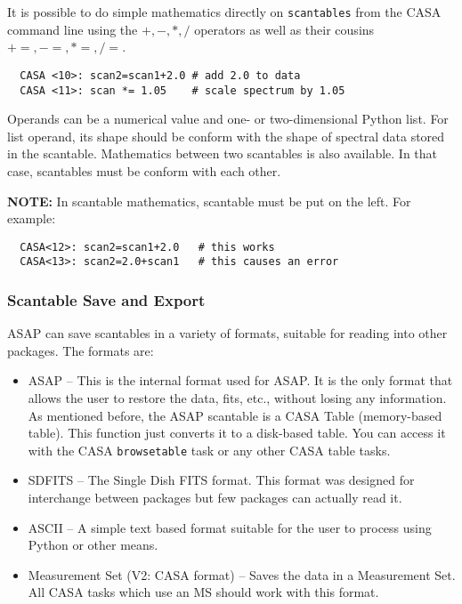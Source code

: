 It is possible to do simple mathematics directly on {\tt scantables}
from the CASA command line using the $+,-,*,/$ operators as well as
their cousins $+=, -=, *=, /=$.  

\small
\begin{verbatim}
  CASA <10>: scan2=scan1+2.0 # add 2.0 to data 
  CASA <11>: scan *= 1.05    # scale spectrum by 1.05 
\end{verbatim}
\normalsize

Operands can be
a numerical value and one- or two-dimensional Python list. For list
operand, its shape should be conform with the shape of spectral data stored in the scantable.
Mathematics between two scantables is also available. In that case,
scantables must be conform with each other.

{\bf NOTE:} In scantable mathematics, scantable must be put on the left.
For example:
\begin{verbatim}
  CASA<12>: scan2=scan1+2.0   # this works
  CASA<13>: scan2=2.0+scan1   # this causes an error
\end{verbatim}


\subsubsection{Scantable Save and Export}
\label{subsubsection:sd.asap.scantable.export}

ASAP can save scantables in a variety of formats, suitable for reading
into other packages. The formats are: 

\begin{itemize}
    \item ASAP -- This is the internal format used for ASAP. It is the only
     format that allows the user to restore the data, fits, etc.,
     without losing any information. As mentioned before, the ASAP
     scantable is a CASA Table (memory-based table). This function
     just converts it to a disk-based table. You can access it with
     the CASA {\tt browsetable} task or any other CASA table tasks. 

   \item SDFITS -- The Single Dish FITS format. This format was designed
     for interchange between packages but few packages can actually
     read it. 

   \item ASCII -- A simple text based format suitable for the user to
     process using Python or other means. 

   \item Measurement Set (V2: CASA format) -- Saves the data in a
     Measurement Set. All CASA tasks which use an MS should work with this format.
\end{itemize}

